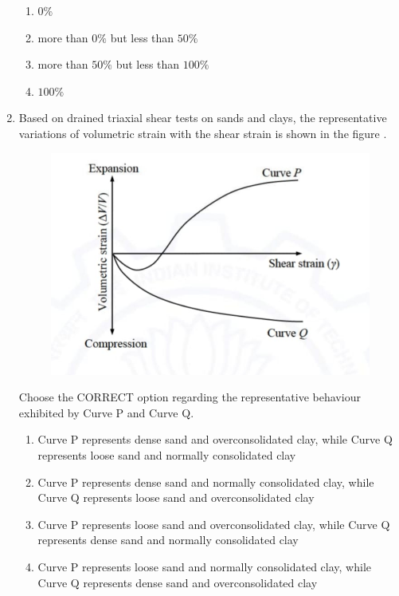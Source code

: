 \documentclass[journal,12pt,onecolumn]{article}
\theoremstyle{remark}
\begin{document}
\begin{enumerate}
\hfill{}
\begin{enumerate}
    \item $0\%$
    \item more than $0\%$ but less than $50\%$
    \item more than $50\%$ but less than $100\%$
    \item $100\%$
\end{enumerate}

\item Based on drained triaxial shear tests on sands and clays, the representative variations of volumetric strain  with the shear strain \brak{\gamma} is shown in the figure .
\begin{figure}[H]
    \centering
    \includegraphics[width=0.7\columnwidth]{figs/1q31.jpg}
    \caption{}
    \label{fig:q31}
\end{figure}
Choose the CORRECT option regarding the representative behaviour exhibited by Curve P and Curve Q.

\hfill{}
\begin{enumerate}
    \item Curve P represents dense sand and overconsolidated clay, while Curve Q represents loose sand and normally consolidated clay
    \item Curve P represents dense sand and normally consolidated clay, while Curve Q represents loose sand and overconsolidated clay
    \item Curve P represents loose sand and overconsolidated clay, while Curve Q represents dense sand and normally consolidated clay
    \item Curve P represents loose sand and normally consolidated clay, while Curve Q represents dense sand and overconsolidated clay
\end{enumerate}


\end{enumerate}
\end{document}
